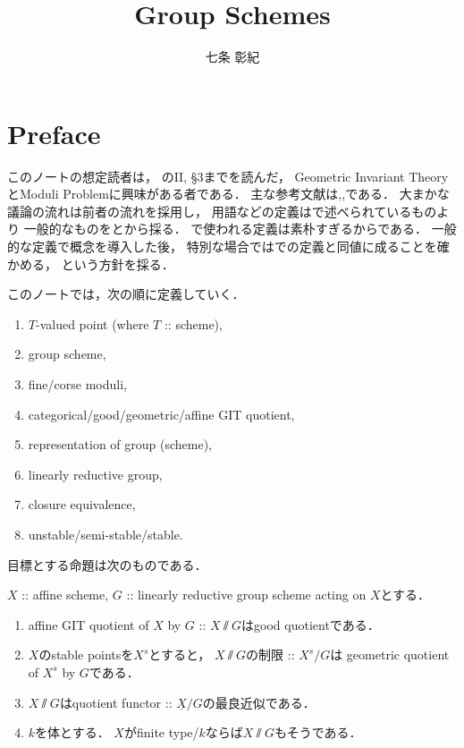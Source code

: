 \documentclass[a4paper]{jsarticle}
\newcommand{\func}[1]{\underline{#1}}
\begin{document}
\title{Group Schemes}
\author{七条 彰紀}
\maketitle

\section{Preface}
    このノートの想定読者は，
    \cite{HarAG}のII, \S 3までを読んだ，
    Geometric Invariant TheoryとModuli Problemに興味がある者である．
    主な参考文献は\cite{Muk1},\cite{AV},\cite{Hos}である．
    大まかな議論の流れは前者の流れを採用し，
    用語などの定義は\cite{Muk1}で述べられているものより
    一般的なものを\cite{AV}と\cite{Hos}から採る．
    \cite{Muk1}で使われる定義は素朴すぎるからである．
    一般的な定義で概念を導入した後，
    特別な場合では\cite{Muk1}での定義と同値に成ることを確かめる，
    という方針を採る．

    このノートでは，次の順に定義していく．
    \begin{enumerate}
        \item $T$-valued point (where $T$ :: scheme),
        \item group scheme,
        \item fine/corse moduli,
        \item categorical/good/geometric/affine GIT quotient,
        \item representation of group (scheme),
        \item linearly reductive group,
        \item closure equivalence,
        \item unstable/semi-stable/stable.
    \end{enumerate}

    目標とする命題は次のものである．
    \begin{Thm}
        $X$ :: affine scheme,
        $G$ :: linearly reductive group scheme acting on $X$とする．
        \begin{enumerate}[label=(\roman*), leftmargin=*]
        \item 
        affine GIT quotient of $X$ by $G$ :: $X \sslash G$はgood quotientである．

        \item
        $X$のstable pointsを$X^s$とすると，
        $X \sslash G$の制限 :: $X^s \slash G$は
        geometric quotient of $X^s$ by $G$である．

        \item
        $X \sslash G$はquotient functor :: $\func{X} \slash G$の最良近似である．

        \item
        $k$を体とする．
        $X$がfinite type/$k$ならば$X \sslash G$もそうである．
        \end{enumerate}
    \end{Thm}
\end{document}
